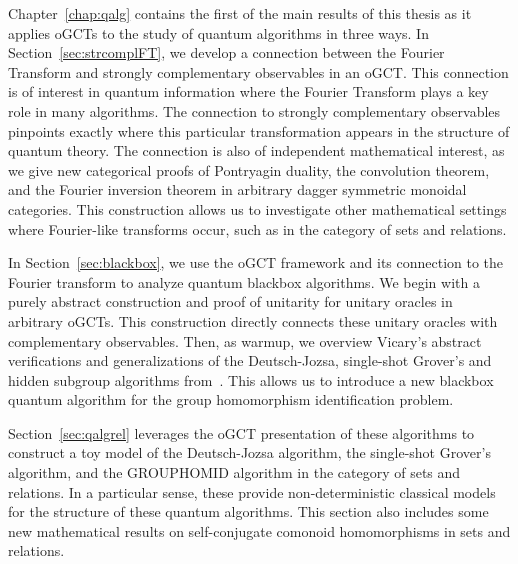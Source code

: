 Chapter~\ref{chap:qalg} contains the first of the main results of this thesis as it applies oGCTs to the study of quantum algorithms in three ways.  In Section~\ref{sec:strcomplFT}, we develop a connection between the Fourier Transform and strongly complementary observables in an oGCT.  This connection is of interest in quantum information where the Fourier Transform plays a key role in many algorithms.  The connection to strongly complementary observables pinpoints exactly where this particular transformation appears in the structure of quantum theory.  The connection is also of independent mathematical interest, as we give new categorical proofs of Pontryagin duality, the convolution theorem, and the Fourier inversion theorem in arbitrary dagger symmetric monoidal categories. This construction allows us to investigate other mathematical settings where Fourier-like transforms occur, such as in the category of sets and relations.

In Section~\ref{sec:blackbox}, we use the oGCT framework and its connection to the Fourier transform to analyze quantum blackbox algorithms.  We begin with a purely abstract construction and proof of unitarity for unitary oracles in arbitrary oGCTs. This construction directly connects these unitary oracles with complementary observables. Then, as warmup, we overview Vicary's abstract verifications and generalizations  of the Deutsch-Jozsa, single-shot Grover's and hidden subgroup algorithms from~\cite{vicary-tqa}.  This allows us to introduce a new blackbox quantum algorithm for the group homomorphism identification problem. 

Section~\ref{sec:qalgrel} leverages the oGCT presentation of these algorithms to construct a toy model of the Deutsch-Jozsa algorithm, the single-shot Grover's algorithm, and the GROUPHOMID algorithm in the category of sets and relations. In a particular sense, these provide non-deterministic classical models for the structure of these quantum algorithms. This section also includes some new mathematical results on self-conjugate comonoid homomorphisms in sets and relations.

